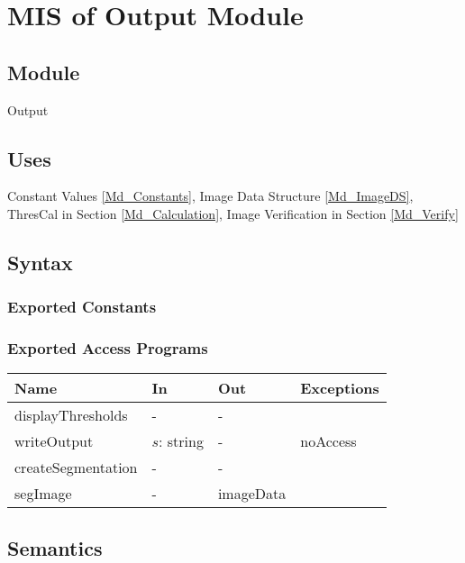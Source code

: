 \documentclass[12pt, titlepage]{article}
\begin{document}
\newpage

\section{MIS of Output Module} \label{Md_Output}

\subsection{Module}

Output

\subsection{Uses}

Constant Values \ref{Md_Constants}, Image Data Structure \ref{Md_ImageDS},
ThresCal in Section \ref{Md_Calculation}, Image Verification in Section
\ref{Md_Verify}

\subsection{Syntax}

\subsubsection{Exported Constants}

\subsubsection{Exported Access Programs}

\begin{center}
\begin{tabular}{p{4cm} p{2cm} p{2cm} p{6cm}}
\hline
\textbf{Name} & \textbf{In} & \textbf{Out} & \textbf{Exceptions} \\
\hline
displayThresholds & - & - &\\
writeOutput & $s$: string & - &
noAccess \\
createSegmentation & - & - &\\
segImage & - & imageData &  \\
\hline
\end{tabular}
\end{center}

\subsection{Semantics}
\end{document}

